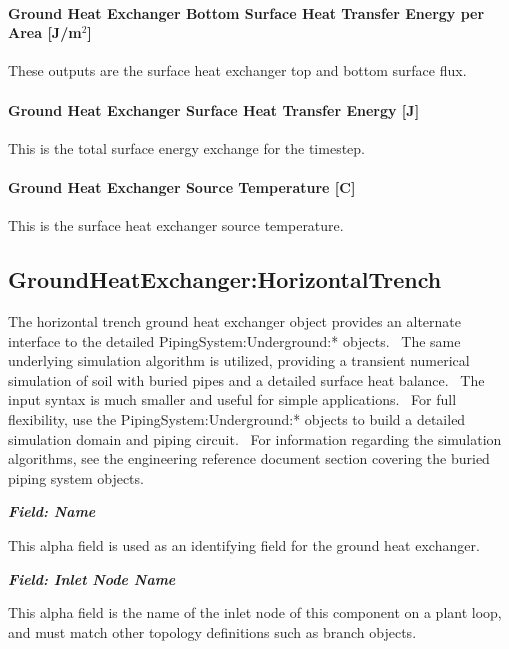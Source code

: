 \paragraph{Ground Heat Exchanger Bottom Surface Heat Transfer Energy per Area {[}J/m\(^{2}\){]}}\label{ground-heat-exchanger-bottom-surface-heat-transfer-energy-per-area-jm2}

These outputs are the surface heat exchanger top and bottom surface flux.

\paragraph{Ground Heat Exchanger Surface Heat Transfer Energy {[}J{]}}\label{ground-heat-exchanger-surface-heat-transfer-energy-j}

This is the total surface energy exchange for the timestep.

\paragraph{Ground Heat Exchanger Source Temperature {[}C{]}}\label{ground-heat-exchanger-source-temperature-c}

This is the surface heat exchanger source temperature.

\subsection{GroundHeatExchanger:HorizontalTrench}\label{groundheatexchangerhorizontaltrench}

The horizontal trench ground heat exchanger object provides an alternate interface to the detailed PipingSystem:Underground:* objects.~ The same underlying simulation algorithm is utilized, providing a transient numerical simulation of soil with buried pipes and a detailed surface heat balance.~ The input syntax is much smaller and useful for simple applications.~ For full flexibility, use the PipingSystem:Underground:* objects to build a detailed simulation domain and piping circuit.~ For information regarding the simulation algorithms, see the engineering reference document section covering the buried piping system objects.

\textbf{\emph{Field: Name}}

This alpha field is used as an identifying field for the ground heat exchanger.

\textbf{\emph{Field: Inlet Node Name}}

This alpha field is the name of the inlet node of this component on a plant loop, and must match other topology definitions such as branch objects.

